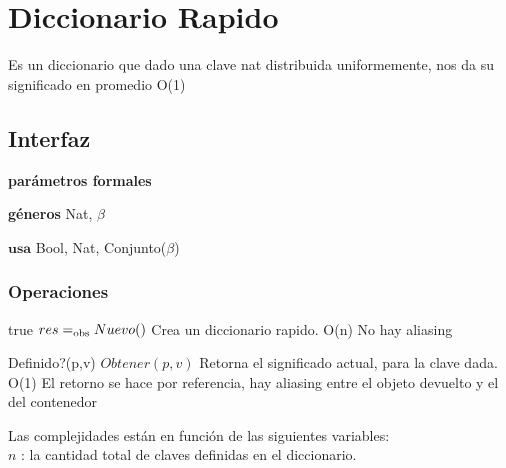 
\section{Diccionario Rapido}

Es un diccionario que dado una clave nat distribuida uniformemente, nos da su significado en promedio O(1)

\subsection{Interfaz}

  \textbf{par\'ametros formales}
  
  \textbf{g\'eneros} Nat, $\beta$\\


$\textbf{usa}$  
Bool, Nat, Conjunto($\beta$)



\subsubsection*{Operaciones}


 {true}
 {$res =_{\mathrm{obs}} Nuevo()$}
 {Crea un diccionario rapido.}
 {O(n)}
 {No hay aliasing}

 {Definido?(p,v)}
 {$Obtener(p,v)$}
 {Retorna el significado actual, para la clave dada.}
 {O(1)}
 {El retorno se hace por referencia, hay aliasing entre el objeto devuelto y el del contenedor}
 
Las complejidades est\'an en funci\'on de las siguientes variables:\\
$n$ : la cantidad total de claves definidas en el diccionario. \\
\\ \\


